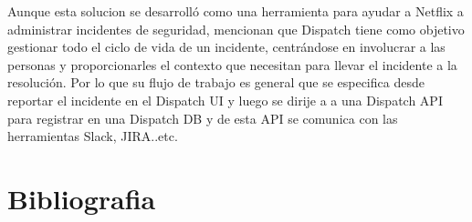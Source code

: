 \documentclass{article}
\begin{document}
Aunque esta solucion se desarrolló como una herramienta para ayudar a Netflix a administrar incidentes de seguridad, mencionan que Dispatch tiene como objetivo gestionar todo el ciclo de vida de un incidente, centrándose en involucrar a las personas y proporcionarles el contexto que necesitan para llevar el incidente a la resolución. Por lo que su flujo de trabajo es general que se especifica desde reportar el incidente en el Dispatch UI y  luego se dirije a a una Dispatch API para registrar en una Dispatch DB y de esta API se comunica con las herramientas Slack, JIRA..etc.



 








\section{Bibliografia}



\nocite{1}
\nocite{2}
\nocite{3}
\end{document}
